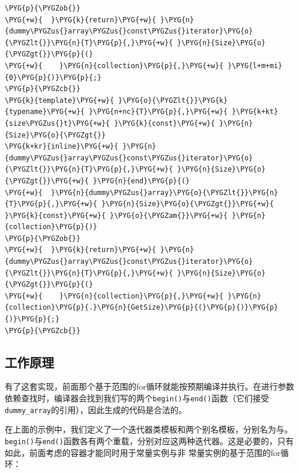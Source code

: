 \begin{codeblockbg}
\begin{Verbatim}[commandchars=\\\{\},breaklines=true,breakanywhere=true,fontsize=\codefont,xleftmargin=17bp]
\PYG{p}{\PYGZob{}}
\PYG{+w}{  }\PYG{k}{return}\PYG{+w}{ }\PYG{n}{dummy\PYGZus{}array\PYGZus{}const\PYGZus{}iterator}\PYG{o}{\PYGZlt{}}\PYG{n}{T}\PYG{p}{,}\PYG{+w}{ }\PYG{n}{Size}\PYG{o}{\PYGZgt{}}\PYG{p}{(}
\PYG{+w}{    }\PYG{n}{collection}\PYG{p}{,}\PYG{+w}{ }\PYG{l+m+mi}{0}\PYG{p}{)}\PYG{p}{;}
\PYG{p}{\PYGZcb{}}
\PYG{k}{template}\PYG{+w}{ }\PYG{o}{\PYGZlt{}}\PYG{k}{typename}\PYG{+w}{ }\PYG{n+nc}{T}\PYG{p}{,}\PYG{+w}{ }\PYG{k+kt}{size\PYGZus{}t}\PYG{+w}{ }\PYG{k}{const}\PYG{+w}{ }\PYG{n}{Size}\PYG{o}{\PYGZgt{}}
\PYG{k+kr}{inline}\PYG{+w}{ }\PYG{n}{dummy\PYGZus{}array\PYGZus{}const\PYGZus{}iterator}\PYG{o}{\PYGZlt{}}\PYG{n}{T}\PYG{p}{,}\PYG{+w}{ }\PYG{n}{Size}\PYG{o}{\PYGZgt{}}\PYG{+w}{ }\PYG{n}{end}\PYG{p}{(}
\PYG{+w}{  }\PYG{n}{dummy\PYGZus{}array}\PYG{o}{\PYGZlt{}}\PYG{n}{T}\PYG{p}{,}\PYG{+w}{ }\PYG{n}{Size}\PYG{o}{\PYGZgt{}}\PYG{+w}{ }\PYG{k}{const}\PYG{+w}{ }\PYG{o}{\PYGZam{}}\PYG{+w}{ }\PYG{n}{collection}\PYG{p}{)}
\PYG{p}{\PYGZob{}}
\PYG{+w}{  }\PYG{k}{return}\PYG{+w}{ }\PYG{n}{dummy\PYGZus{}array\PYGZus{}const\PYGZus{}iterator}\PYG{o}{\PYGZlt{}}\PYG{n}{T}\PYG{p}{,}\PYG{+w}{ }\PYG{n}{Size}\PYG{o}{\PYGZgt{}}\PYG{p}{(}
\PYG{+w}{    }\PYG{n}{collection}\PYG{p}{,}\PYG{+w}{ }\PYG{n}{collection}\PYG{p}{.}\PYG{n}{GetSize}\PYG{p}{(}\PYG{p}{)}\PYG{p}{)}\PYG{p}{;}
\PYG{p}{\PYGZcb{}}
\end{Verbatim}
\end{codeblockbg}



\subsection{工作原理}



有了这套实现，前面那个基于范围的for循环就能按预期编译并执行。在进行参数依赖查找时，编译器会找到我们写的两个\texttt{begin()}与\texttt{end()}函数（它们接受\texttt{dummy\_\allowbreak{}array}的引用），因此生成的代码是合法的。



在上面的示例中，我们定义了一个迭代器类模板和两个别名模板，分别名为与。\texttt{begin()}与\texttt{end()}函数各有两个重载，分别对应这两种迭代器。这是必要的，只有如此，前面考虑的容器才能同时用于常量实例与非 常量实例的基于范围的for循环：



